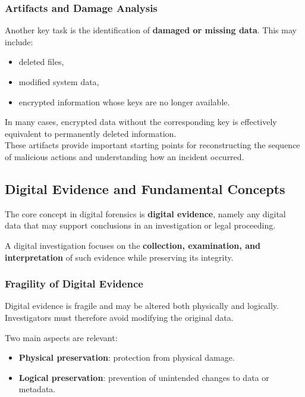 \subsubsection*{Artifacts and Damage Analysis}

Another key task is the identification of \textbf{damaged or missing data}. This may include:

\begin{itemize}
\item deleted files,
\item modified system data,
\item encrypted information whose keys are no longer available.
\end{itemize}
\noindent
In many cases, encrypted data without the corresponding key is effectively equivalent to permanently deleted information.
\\
These artifacts provide important starting points for reconstructing the sequence of malicious actions and understanding how an incident occurred.

\subsection{Digital Evidence and Fundamental Concepts}

The core concept in digital forensics is \textbf{digital evidence}, namely any digital data that may support conclusions in an investigation or legal proceeding.

\medskip
\noindent
A digital investigation focuses on the \textbf{collection, examination, and interpretation} of such evidence while preserving its integrity.

\subsubsection{Fragility of Digital Evidence}

Digital evidence is fragile and may be altered both physically and logically. Investigators must therefore avoid modifying the original data.

Two main aspects are relevant:

\begin{itemize}
\item \textbf{Physical preservation}: protection from physical damage.
\item \textbf{Logical preservation}: prevention of unintended changes to data or metadata.
\end{itemize}

